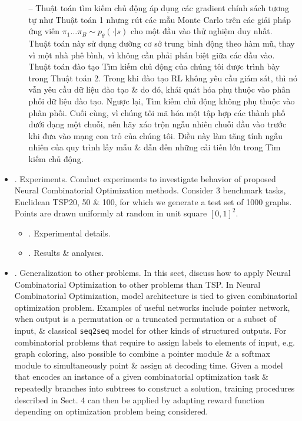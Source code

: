 \documentclass{article}
\begin{document}
\begin{itemize}
\begin{enumerate}
        -- Thuật toán tìm kiếm chủ động áp dụng các gradient chính sách tương tự như Thuật toán 1 nhưng rút các mẫu Monte Carlo trên các giải pháp ứng viên $\pi_1\ldots\pi_B\sim p_\theta(\cdot|s)$ cho một đầu vào thử nghiệm duy nhất. Thuật toán này sử dụng đường cơ sở trung bình động theo hàm mũ, thay vì một nhà phê bình, vì không cần phải phân biệt giữa các đầu vào. Thuật toán đào tạo Tìm kiếm chủ động của chúng tôi được trình bày trong Thuật toán 2. Trong khi đào tạo RL không yêu cầu giám sát, thì nó vẫn yêu cầu dữ liệu đào tạo \& do đó, khái quát hóa phụ thuộc vào phân phối dữ liệu đào tạo. Ngược lại, Tìm kiếm chủ động không phụ thuộc vào phân phối. Cuối cùng, vì chúng tôi mã hóa một tập hợp các thành phố dưới dạng một chuỗi, nên hãy xáo trộn ngẫu nhiên chuỗi đầu vào trước khi đưa vào mạng con trỏ của chúng tôi. Điều này làm tăng tính ngẫu nhiên của quy trình lấy mẫu \& dẫn đến những cải tiến lớn trong Tìm kiếm chủ động.
    \end{enumerate}
    \item {. Experiments.} Conduct experiments to investigate behavior of proposed Neural Combinatorial Optimization methods. Consider 3 benchmark tasks, Euclidean TSP20, 50 \& 100, for which we generate a test set of 1000 graphs. Points are drawn uniformly at random in unit square $[0,1]^2$.
    \begin{itemize}
        \item {. Experimental details.}
        \item {. Results \& analyses.}
    \end{itemize}
    \item {. Generalization to other problems.} In this sect, discuss how to apply Neural Combinatorial Optimization to other problems than TSP. In Neural Combinatorial Optimization, model architecture is tied to given combinatorial optimization problem. Examples of useful networks include pointer network, when output is a permutation or a truncated permutation or a subset of input, \& classical {\tt seq2seq} model for other kinds of structured outputs. For combinatorial problems that require to assign labels to elements of input, e.g. graph coloring, also possible to combine a pointer module \& a softmax module to simultaneously point \& assign at decoding time. Given a model that encodes an instance of a given combinatorial optimization task \& repeatedly branches into subtrees to construct a solution, training procedures described in Sect. 4 can then be applied by adapting reward function depending on optimization problem being considered.
    

\end{itemize}
\end{document}
